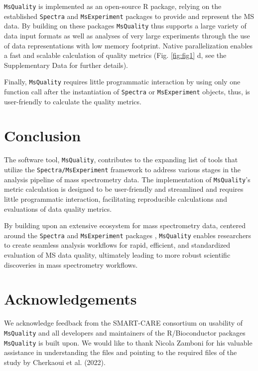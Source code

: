 \documentclass{bioinfo}
\begin{document}
\texttt{MsQuality} is implemented as an open-source R package, relying on the
established \texttt{Spectra} and \texttt{MsExperiment} packages
\citep{Rainer2022} to provide and represent the MS data. By building on these
packages \texttt{MsQuality} thus supports a large variety of data input formats
as well as analyses of very large experiments through the use of data
representations with low memory footprint. Native parallelization enables a fast
and scalable calculation of quality metrics (Fig. \ref{fig:fig1} d, 
see the Supplementary Data for further details).

Finally, \texttt{MsQuality} requires little programmatic interaction
by using only one function call after the instantiation of \texttt{Spectra} or 
\texttt{MsExperiment} objects, thus, is user-friendly 
to calculate the quality metrics.


\section{Conclusion}

The software tool, \texttt{MsQuality}, contributes to the expanding list of 
tools that utilize the \texttt{Spectra/MsExperiment} framework to address 
various stages in the analysis pipeline of mass spectrometry data.
The implementation of \texttt{MsQuality}'s metric calculation is designed
to be user-friendly and streamlined and requires little programmatic 
interaction, facilitating reproducible calculations and evaluations of data 
quality metrics.

By building upon an extensive ecosystem for mass spectrometry data, centered
around the \texttt{Spectra} and \texttt{MsExperiment} packages \citep{Rainer2022},  
\texttt{MsQuality} enables researchers to create seamless analysis workflows 
for rapid, efficient, and standardized evaluation of MS data quality, 
ultimately leading to more robust scientific discoveries in mass spectrometry
workflows.


\section{Acknowledgements}

We acknowledge feedback from the SMART-CARE consortium on usability of 
\texttt{MsQuality} and all developers and maintainers of the R/Bioconductor 
packages \texttt{MsQuality} is built upon. We would like to thank Nicola Zamboni
for his valuable assistance in understanding the files and pointing to the 
required files of the study by Cherkaoui et al. (2022).
\end{document}
